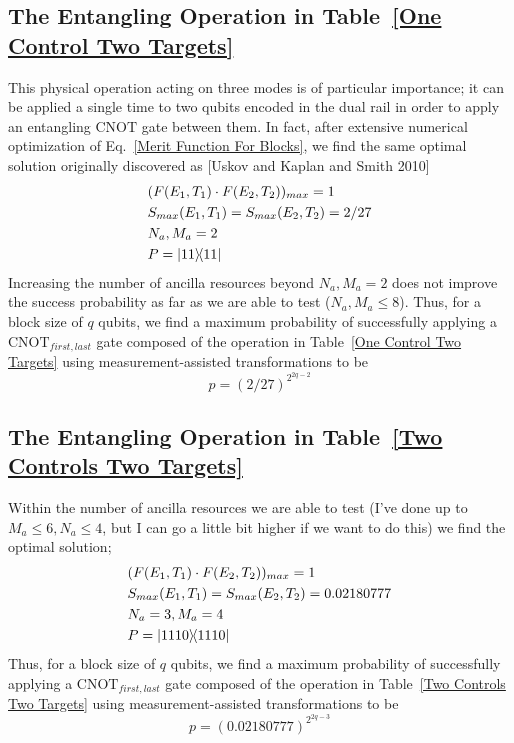 \documentclass[aps,pra,twocolumn,showpacs,superscriptaddress,floatfix,10pt]{revtex4}
\begin{document}
\subsection{The Entangling Operation in Table~\ref{One Control Two Targets}}
This physical operation acting on three modes is of particular importance; it can be applied a single time to two qubits encoded in the dual rail in order to apply an entangling $\mbox{CNOT}$ gate between them. In fact, after extensive numerical optimization of Eq.~\ref{Merit Function For Blocks}, we find the same optimal solution originally discovered as [Uskov and Kaplan and Smith 2010]
\begin{eqnarray}
& (F(E_1,T_1) \cdot F(E_2,T_2))_{max} = 1 \nonumber \\
& S_{max}(E_1,T_1) = S_{max}(E_2,T_2) = 2/27 \\
& N_a,M_a=2 \nonumber \\
& P = \outerproduct{11}{11} \nonumber	
\end{eqnarray}
Increasing the number of ancilla resources beyond $N_a,M_a=2$ does not improve the success probability as far as we are able to test ($N_a,M_a \le 8$). Thus, for a block size of $q$ qubits, we find a maximum probability of successfully applying a $\mbox{CNOT}_{first,last}$ gate composed of the operation in Table~\ref{One Control Two Targets} using measurement-assisted transformations to be
\begin{equation}
\label{1C2T Result}
p = (2/27)^{2^{2q-2}}
\end{equation}
\subsection{The Entangling Operation in Table~\ref{Two Controls Two Targets}}
Within the number of ancilla resources we are able to test (I've done up to $M_a \le 6,N_a \le 4$, but I can go a little bit higher if we want to do this) we find the optimal solution;
\begin{eqnarray}
&(F(E_1,T_1) \cdot F(E_2,T_2))_{max} = 1 \\
&S_{max}(E_1,T_1) = S_{max}(E_2,T_2) = 0.02180777 \\
&N_a = 3,M_a=4 \\
&P = \outerproduct{1110}{1110}	
\end{eqnarray}
Thus, for a block size of $q$ qubits, we find a maximum probability of successfully applying a $\mbox{CNOT}_{first,last}$ gate composed of the operation in Table~\ref{Two Controls Two Targets} using measurement-assisted transformations to be
\begin{equation}
\label{2C2T Result}
p = (0.02180777)^{2^{2q-3}}
\end{equation}
\end{document}
